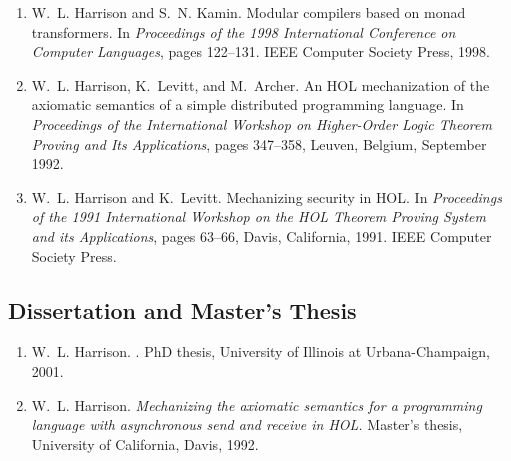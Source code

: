 \documentclass[12pt]{article} %
\begin{document}
\begin{enumerate}[leftmargin=0.0mm]
\item
W.~L. Harrison and S.~N. Kamin.
\newblock Modular compilers based on monad transformers.
\newblock In {\em Proceedings of the 1998 International Conference on Computer
  Languages}, pages 122--131. IEEE Computer Society Press, 1998.


\item
W.~L. Harrison, K.~Levitt, and M.~Archer.
\newblock An {HOL} mechanization of the axiomatic semantics of a simple
  distributed programming language.
\newblock In {\em Proceedings of the International Workshop on Higher-Order
  Logic Theorem Proving and Its Applications}, pages 347--358, Leuven, Belgium,
  September 1992.

\item
W.~L. Harrison and K.~Levitt.
\newblock Mechanizing security in {HOL}.
\newblock In {\em Proceedings of the 1991 International Workshop on the {HOL}
  Theorem Proving System and its Applications}, pages 63--66, Davis,
  California, 1991. IEEE Computer Society Press.



\end{enumerate}


\subsection*{Dissertation and Master's Thesis}


\begin{enumerate}[leftmargin=0.0mm]

\item
W.~L. Harrison.
.
\newblock PhD thesis, University of Illinois at Urbana-Champaign, 2001.

\item
W.~L. Harrison.
\newblock \emph{Mechanizing the axiomatic semantics for a programming language with
  asynchronous send and receive in {HOL}.}
\newblock Master's thesis, University of California, Davis, 1992.


\thispagestyle{fancyplain}
\fancyhf{}
\renewcommand{\headrulewidth}{0pt}
\cfoot{ \fancyplain{}{\thepage} }

\end{enumerate}
\end{document}
